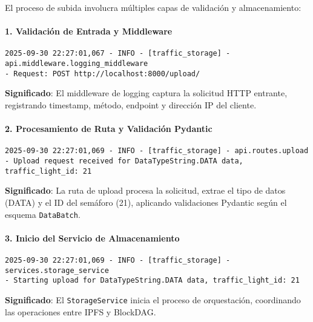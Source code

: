 \documentclass[onecolumn]{article}
\begin{document}
El proceso de subida involucra múltiples capas de validación y almacenamiento:

\paragraph{1. Validación de Entrada y Middleware}
\begin{verbatim}
2025-09-30 22:27:01,067 - INFO - [traffic_storage] - api.middleware.logging_middleware 
- Request: POST http://localhost:8000/upload/
\end{verbatim}
\textbf{Significado}: El middleware de logging captura la solicitud HTTP entrante, registrando timestamp, método, endpoint y dirección IP del cliente.

\paragraph{2. Procesamiento de Ruta y Validación Pydantic}
\begin{verbatim}
2025-09-30 22:27:01,069 - INFO - [traffic_storage] - api.routes.upload 
- Upload request received for DataTypeString.DATA data, traffic_light_id: 21
\end{verbatim}
\textbf{Significado}: La ruta de upload procesa la solicitud, extrae el tipo de datos (DATA) y el ID del semáforo (21), aplicando validaciones Pydantic según el esquema \texttt{DataBatch}.

\paragraph{3. Inicio del Servicio de Almacenamiento}
\begin{verbatim}
2025-09-30 22:27:01,069 - INFO - [traffic_storage] - services.storage_service 
- Starting upload for DataTypeString.DATA data, traffic_light_id: 21
\end{verbatim}
\textbf{Significado}: El \texttt{StorageService} inicia el proceso de orquestación, coordinando las operaciones entre IPFS y BlockDAG.
\end{document}
